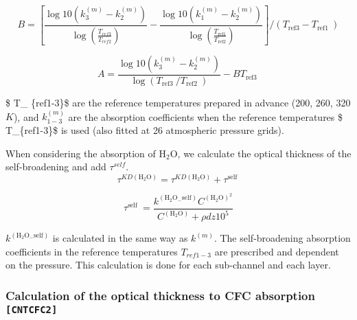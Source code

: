 \begin{equation}
B=\left[\frac{\log 10\left(k_{3}^{(m)}-k_{2}^{(m)}\right)}{\log \left(\frac{T_{r e f 3}}{T_{r e f 2}}\right)}-\frac{\log 10\left(k_{1}^{(m)}-k_{2}^{(m)}\right)}{\log \left(\frac{T_{\text {ref1} }}{T_{\text {ref2}}}\right)}\right] /\left(T_{\text {ref3}}-T_{\text {ref1 }}\right)
\end{equation}

\begin{equation}
A=\frac{\log 10\left(k_{3}^{(m)}-k_{2}^{(m)}\right)}{\log \left(T_{\text {ref3 } } / T_{\text {ref2 } }\right)}-B T_{\text {ref3 }}
\end{equation}

\$ T\_ \{ref1-3\}\$ are the reference temperatures prepared in advance
(200, 260, 320 \(K\)), and \(k_{1-3}^{(m)}\) are the absorption
coefficients when the reference temperatures \$ T\_\{ref1-3\}\$ is used
(also fitted at 26 atmospheric pressure grids).

When considering the absorption of \(\mathrm{H}_{2} \mathrm{O}\), we
calculate the optical thickness of the self-broadening and add
\(\tau^{self}\). \begin{equation}
\tau^{K D\left(\mathrm{H}_{2} \mathrm{O}\right)}=\tau^{K D\left(\mathrm{H}_{2} \mathrm{O}\right)}+\tau^{\text {self }}
\end{equation}

\begin{equation}
\tau^{\text {self }}=\frac{k^{\left(\mathrm{H}_{2} \mathrm{O}_{-} \mathrm{self}\right)} C^{\left(\mathrm{H}_{2} \mathrm{O}\right)^{2}}}{C^{\left(\mathrm{H}_{2} \mathrm{O}\right)}+\rho d z 10^{5}}
\end{equation}

\(k^{(\mathrm{H}_{2} \mathrm{O}_{-} \mathrm{self})}\) is calculated in
the same way as \(k^{(m)}\). The self-broadening absorption coefficients
in the reference temperatures \(T_{ref1-3}\) are prescribed and
dependent on the pressure. This calculation is done for each sub-channel
and each layer.

\hypertarget{calculation-of-the-optical-thickness-to-cfc-absorption-cntcfc2}{%
\subsubsection{\texorpdfstring{Calculation of the optical thickness to
CFC absorption
\texttt{{[}CNTCFC2{]}}}{Calculation of the optical thickness to CFC absorption {[}CNTCFC2{]}}}\label{calculation-of-the-optical-thickness-to-cfc-absorption-cntcfc2}}

